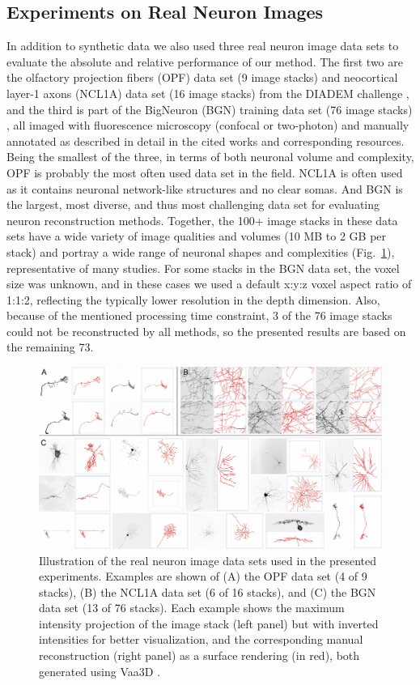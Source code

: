 \subsection{Experiments on Real Neuron Images}
\label{subsec:eval-real}
In addition to synthetic data we also used three real neuron image data sets to evaluate the absolute and relative performance of our method. The first two are the olfactory projection fibers (OPF) data set (9 image stacks) and neocortical layer-1 axons (NCL1A) data set (16 image stacks) from the DIADEM challenge \cite{brown2011diadem}, and the third is part of the BigNeuron (BGN) training data set (76 image stacks) \cite{peng2015bigneuron}, all imaged with fluorescence microscopy (confocal or two-photon) and manually annotated as described in detail in the cited works and corresponding resources. Being the smallest of the three, in terms of both neuronal volume and complexity, OPF is probably the most often used data set in the field. NCL1A is often used as it contains neuronal network-like structures and no clear somas. And BGN is the largest, most diverse, and thus most challenging data set for evaluating neuron reconstruction methods. Together, the 100+ image stacks in these data sets have a wide variety of image qualities and volumes (10 MB to 2 GB per stack) and portray a wide range of neuronal shapes and complexities (Fig.~\ref{fig13}), representative of many studies. For some stacks in the BGN data set, the voxel size was unknown, and in these cases we used a default x:y:z voxel aspect ratio of 1:1:2, reflecting the typically lower resolution in the depth dimension. Also, because of the mentioned processing time constraint, 3 of the 76 image stacks could not be reconstructed by all methods, so the presented results are based on the remaining 73.
\begin{figure}
	\centering
	\includegraphics[width=\textwidth]{fig13}
	\caption{Illustration of the real neuron image data sets used in the presented experiments. Examples are shown of (A) the OPF data set (4 of 9 stacks), (B) the NCL1A data set (6 of 16 stacks), and (C) the BGN data set (13 of 76 stacks). Each example shows the maximum intensity projection of the image stack (left panel) but with inverted intensities for better visualization, and the corresponding manual reconstruction (right panel) as a surface rendering (in red), both generated using Vaa3D \cite{peng2010v3d}.}
	\label{fig13}
\end{figure}
